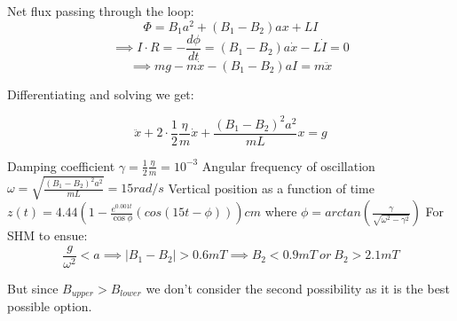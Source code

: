 \documentclass[11pt,a4paper]{scrartcl}
\begin{document}
\begin{solution}
\begin{tikzpicture}[x=0.75pt,y=0.75pt,yscale=-1,xscale=1]
\end{tikzpicture}
 
 
 
 
 
 
Net flux passing through the loop:
$$\Phi = B_1 a^2+(B_1-B_2)ax+LI$$
$$\implies I\cdot R = -\frac{d\phi}{dt}=(B_1-B_2)a\dot{x}-L\dot{I}=0$$
$$\implies mg - m\dot{x}-(B_1-B_2)aI=m\ddot{x}$$

Differentiating and solving we get:

$$\ddot{x}+2\cdot \frac{1}{2}\frac{\eta}{m}\dot{x}+\frac{(B_1-B_2)^2a^2}{mL}x = g$$

Damping coefficient $\boxed{\gamma=\frac{1}{2}\frac{\eta}{m}=10^{-3}}$\newline
Angular frequency of oscillation $\boxed{\omega =\sqrt{\frac{(B_1-B_2)^2a^2}{mL}}=15 rad/s}$\newline
Vertical position as a function of time
$\boxed{z(t)=4.44\left(1-\frac{e^{0.001t}}{\cos \phi}(cos(15t-\phi))\right)cm}$\newline
               where $\phi=arctan(\frac{\gamma}{\sqrt{\omega^2-\gamma^2}})$
\newline
For SHM to ensue:
$$\frac{g}{\omega^2}<a\implies \left| B_1-B_2 \right|>0.6mT \implies \boxed{B_2<0.9mT}\ or \ B_2>2.1mT$$

But since $B_{upper}>B_{lower}$ we don't consider the second possibility as it is the best possible option.


\end{solution}
\vspace{10mm}%
\end{document}
